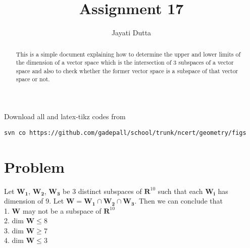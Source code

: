 \documentclass[journal,12pt,onecolumn]{IEEEtran}
\begin{document}
\let\StandardTheFigure\thefigure
\let\vec\mathbf
\renewcommand{\thefigure}{\theproblem}



\def\putbox#1#2#3{\makebox[0in][l]{\makebox[#1][l]{}\raisebox{\baselineskip}[0in][0in]{\raisebox{#2}[0in][0in]{#3}}}}
     \def\rightbox#1{\makebox[0in][r]{#1}}
     \def\centbox#1{\makebox[0in]{#1}}
     \def\topbox#1{\raisebox{-\baselineskip}[0in][0in]{#1}}
     \def\midbox#1{\raisebox{-0.5\baselineskip}[0in][0in]{#1}}

\vspace{3cm}


\title{Assignment 17}
\author{Jayati Dutta}





\maketitle



\bigskip

\renewcommand{\thefigure}{\theenumi}
\renewcommand{\thetable}{\theenumi}


\begin{abstract}
This is a simple document explaining how to determine the upper and lower limits of the dimension of a vector space which is the intersection of 3 subspaces of a vector space and also to check whether the former vector space is a subspace of that vector space or not.
\end{abstract}

%

Download all and latex-tikz codes from 
%
\begin{lstlisting}
svn co https://github.com/gadepall/school/trunk/ncert/geometry/figs
\end{lstlisting}
%


\section{Problem}
Let $\vec{W_1}$, $\vec{W_2}$, $\vec{W_3}$ be 3 distinct subspaces of $\vec{R}^{10}$ such that each $\vec{W_i}$ has dimension of 9. Let $\vec{W} = \vec{W_1} \cap \vec{W_2} \cap \vec{W_3}$. Then we can conclude that\\
1. $\vec{W}$ may not be a subspace of $\vec{R}^{10}$\\
2. dim $\vec{W} \leq 8$\\
3. dim $\vec{W} \geq 7$\\
4. dim $\vec{W} \leq 3$\\
 
\end{document}
